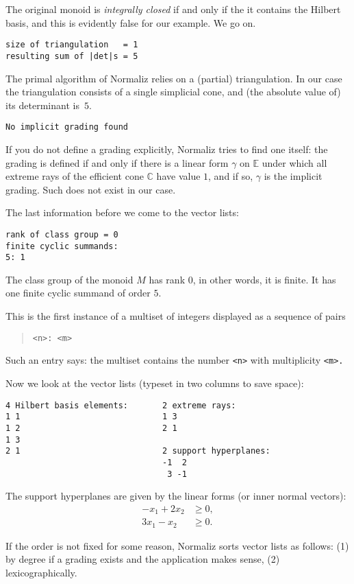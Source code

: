 \documentclass[12pt,a4paper]{scrartcl}
\theoremstyle{definition}
\def\CC{{\mathbb C}}
\def\EE{{\mathbb E}}
\begin{document}
The original monoid is \emph{integrally closed} if and only if the it contains the Hilbert basis, and this is evidently false for our example. We go on.

\begin{Verbatim}
size of triangulation   = 1
resulting sum of |det|s = 5
\end{Verbatim}
The primal algorithm of Normaliz relies on a (partial) triangulation. In our case the triangulation consists of a single simplicial cone, and (the absolute value of) its determinant is~$5$.
\begin{Verbatim}
No implicit grading found
\end{Verbatim}
If you do not define a grading explicitly, Normaliz tries to find one itself: the grading is defined if and only if there is a linear form $\gamma$ on $\EE$ under which all extreme rays of the efficient cone $\CC$ have value $1$, and if so, $\gamma$ is the implicit grading. Such does not exist in our case.

The last information before we come to the vector lists:
\begin{Verbatim}
rank of class group = 0
finite cyclic summands:
5: 1  
\end{Verbatim}
The class group of the monoid $M$ has rank $0$, in other words, it is finite. It has one finite cyclic summand of order $5$.

This is the first instance of a multiset of integers displayed as a sequence of pairs
\begin{quote}
	\verb|<n>: <m>|
\end{quote}
Such an entry says: the multiset contains the number \verb|<n>| with multiplicity \verb|<m>.|


Now we look at the vector lists (typeset in two columns to save space):
\begin{Verbatim}
4 Hilbert basis elements:       2 extreme rays:
1 1                             1 3
1 2                             2 1
1 3
2 1                             2 support hyperplanes:
                                -1  2
                                 3 -1
\end{Verbatim}

The support hyperplanes are given by the linear forms (or inner normal vectors):
\begin{align*}
-x_1+2x_2&\ge 0,\\
3x_1-x_2&\ge 0.
\end{align*}

If the order is not fixed for some reason, Normaliz sorts vector lists as follows: (1) by degree if a grading exists and the application makes sense, (2) lexicographically.
\end{document}
